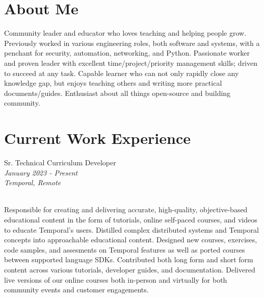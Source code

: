 \documentclass[10pt]{article} %
\begin{document}
\begin{minipage}[t]{0.5\textwidth} %
\vspace{0pt} %
    
\section{About Me}
Community leader and educator who loves teaching and helping people grow. Previously worked in various engineering roles, both software and systems, with a penchant for security, automation, networking, and Python. Passionate worker and proven leader with excellent time/project/priority management skills; driven to succeed at any task. Capable learner who can not only rapidly close any knowledge gap, but enjoys teaching others and writing more practical documents/guides. Enthusiast about all things open-source and building community. \\


\section{Current Work Experience} 


{\raggedright\large Sr. Technical Curriculum Developer\\
\small \textit{January 2023 - Present}\\
\small \textit{Temporal, Remote}} \\

\normalsize{
    Responsible for creating and delivering accurate, high-quality, objective-based educational content in the form of tutorials, online self-paced courses, and videos to educate Temporal's users. Distilled complex distributed systems and Temporal concepts into approachable educational content. Designed new courses, exercises, code samples, and assesments on Temporal features as well as ported courses between supported language SDKs. Contributed both long form and short form content across various tutorials, developer guides, and documentation. Delivered live versions of our online courses both in-person and virtually for both community events and customer engagements.
} \\


\end{minipage}
\end{document}
